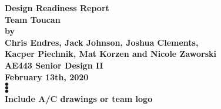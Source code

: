 \documentclass[conf]{new-aiaa}
\begin{document}
\begin{titlepage}
    \begin{center}
        \vspace*{1cm}
        {\LARGE \textbf{Design Readiness Report} \\
        \vspace{0.5cm}
        \textbf{Team Toucan}} \\
        \vspace{0.5cm}
        {\normalsize
        \textbf{by} \\
        \vspace{0.5cm}
        \textbf{Chris Endres, Jack Johnson, Joshua Clements,\\ Kacper Piechnik, Mat Korzen and Nicole Zaworski} \\
        \vspace{0.5cm}
        \textbf{AE443 Senior Design II}\\
        \vspace{0.5cm}
        \textbf{February 13th, 2020}} \\
        \vspace{2.5cm}
        {\Large
        $\bullet$\\
        \vspace{2.5cm}
        $\bullet$\\
        \vspace{2.5cm}
        $\bullet$\\
        \vspace{1.75cm}}
        \textbf{Include A/C drawings or team logo}
    \end{center}
\end{titlepage}

\newpage

\end{document}
